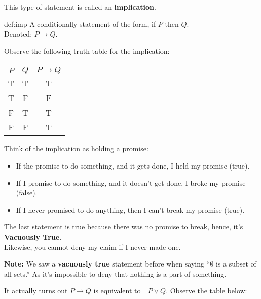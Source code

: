 \newpage

\noindent
This type of statement is called an \textbf{implication}.
\begin{Def}[Implication]{def:imp}
    A conditionally statement of the form, if $P$ then $Q$.\\
    Denoted: $P \rightarrow Q$.
\end{Def}

\noindent
Observe the following truth table for the implication:

\begin{center}
    \begin{tabular}{|c|c|c|}
        \hline
        \rowcolor{OliveGreen!10}
        $P$ & $Q$ & $P \rightarrow Q$ \\
        \hline
        T   & T   & T                 \\
        T   & F   & F                 \\
        F   & T   & T                 \\
        F   & F   & T                 \\
        \hline
    \end{tabular}
\end{center}

\noindent
Think of the implication as holding a promise:
\begin{itemize}
    \item If the promise to do something, and it gets done, I held my promise (true).
    \item If I promise to do something, and it doesn't get done, I broke my promise (false).
    \item If I never promised to do anything, then I can't break my promise (true).
\end{itemize}
The last statement is true because \underline{there was no promise to break,} hence, it's \textbf{Vacuously True}.\\
Likewise, you cannot deny my claim if I never made one.\\

\begin{Note}
    \textbf{Note:} We saw a \textbf{vacuously true} statement before when saying ``$\emptyset$ is a subset of all sets.''
    As it's impossible to deny that nothing is a part of something.
\end{Note}

\noindent
It actually turns out $P \rightarrow Q$ is equivalent to $\neg P \lor Q$. Observe the table below:\\

